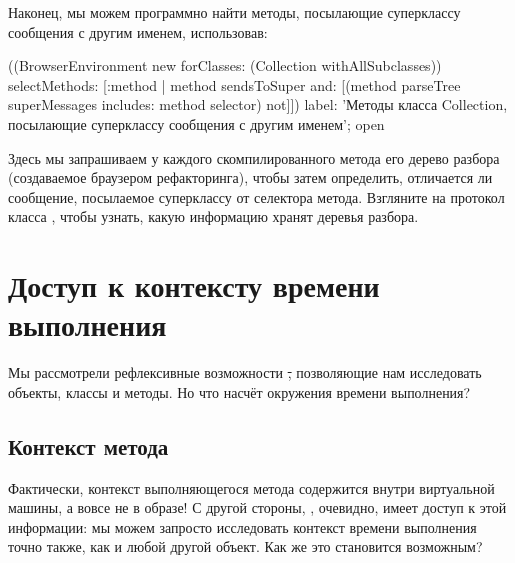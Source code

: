 \documentclass[a4paper,10pt,twoside]{book}
\begin{document}
Наконец, мы можем программно найти методы, посылающие суперклассу сообщения с другим именем, использовав:
\begin{code}{}
((BrowserEnvironment new forClasses: (Collection withAllSubclasses))
	selectMethods: [:method | 
		method sendsToSuper
		and: [(method parseTree superMessages includes: method selector) not]])
	label: 'Методы класса Collection, посылающие суперклассу сообщения с другим именем';
	open
\end{code}
Здесь мы запрашиваем у каждого скомпилированного метода его дерево разбора (создаваемое браузером рефакторинга), чтобы затем определить, отличается ли сообщение, посылаемое суперклассу от селектора метода.
Взгляните на протокол  класса , чтобы узнать, какую информацию хранят деревья разбора.

\section{Доступ к контексту времени выполнения}

Мы рассмотрели рефлексивные возможности \st, позволяющие нам исследовать объекты, классы и методы. Но что насчёт окружения времени выполнения?

\subsection{Контекст метода}

Фактически, контекст выполняющегося метода содержится внутри виртуальной машины, а вовсе не в образе!
С другой стороны, , очевидно, имеет доступ к этой информации: мы можем запросто исследовать контекст времени выполнения точно также, как и любой другой объект.
Как же это становится возможным?
\end{document}
